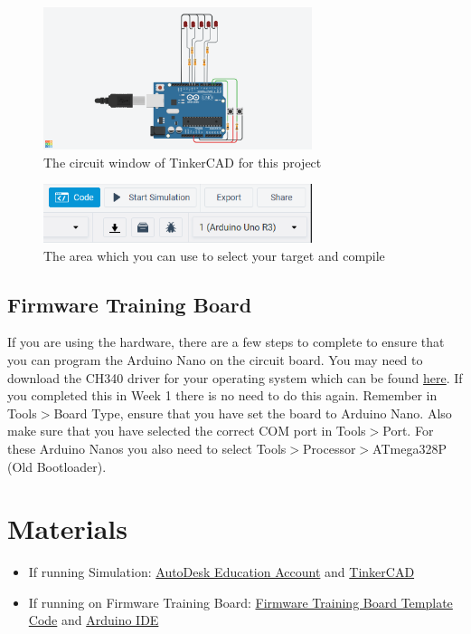 \documentclass{article}
\begin{document}
        \begin{figure}[ht]
            \centering
            \includegraphics[width = 0.7\textwidth]{images/TinkerCadWires.png}
            \caption{The circuit window of TinkerCAD for this project}
        \end{figure}
        
        \begin{figure}[ht]
            \centering
            \includegraphics[width = 0.7\textwidth]{images/TinkerCadCode.png}
            \caption{The area which you can use to select your target and compile}
        \end{figure}
    
    \subsection{Firmware Training Board}
    If you are using the hardware, there are a few steps to complete to ensure that you can program the Arduino Nano on the circuit board. You may need to download the CH340 driver for your operating system which can be found \href{https://learn.sparkfun.com/tutorials/how-to-install-ch340-drivers/all}{here}. If you completed this in Week 1 there is no need to do this again. Remember in Tools$>$Board Type, ensure that you have set the board to Arduino Nano. Also make sure that you have selected the correct COM port in Tools$>$Port. For these Arduino Nanos you also need to select Tools$>$Processor$>$ATmega328P (Old Bootloader). 
    
        

\section{Materials}
\begin{itemize}
	\item If running Simulation: \href{https://www.autodesk.com/education/edu-software/overview}{AutoDesk Education Account} and \href{https://www.tinkercad.com/things/8J1RA4SvqOM}{TinkerCAD}
	\item If running on Firmware Training Board: \href{https://github.com/RoboJackets/firmware-training/blob/master/code/Week2/Week_2_Template/Week_2_Template.ino}{Firmware Training Board Template Code} and \href{https://www.arduino.cc/en/software}{Arduino IDE}
\end{itemize}
\end{document}
